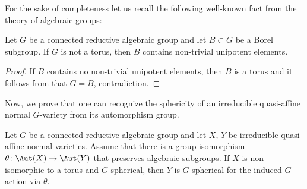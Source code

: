 For the sake of completeness let us recall the following well-known fact from the theory of
algebraic groups:

\begin{lemma}
\label{lem.B_contains_unipotent_elements}
Let $G$ be a connected reductive algebraic group and let $B \subset G$ be a Borel subgroup.
If $G$ is not a torus, then $B$ contains non-trivial unipotent elements.
\end{lemma}

\begin{proof}
If $B$ contains no non-trivial unipotent elements, then $B$ is a torus and it follows from
\cite[Prop.\,21.4B]{Hu1975Linear-algebraic-g} that $G = B$, contradiction.
\end{proof}

Now, we prove that one can recognize the sphericity of an irreducible
quasi-affine normal $G$-variety from its automorphism group.

\begin{proposition}
\label{prop.iso_and_sphericity}
Let $G$ be a connected reductive algebraic group and
let $X$, $Y$ be irreducible quasi-affine normal varieties.
Assume that there is a group isomorphism
$\theta \colon \Aut(X) \to \Aut(Y)$ that preserves algebraic subgroups.
If $X$ is non-isomorphic to a torus and $G$-spherical,
then $Y$ is $G$-spherical for the induced $G$-action via $\theta$.
\end{proposition}


